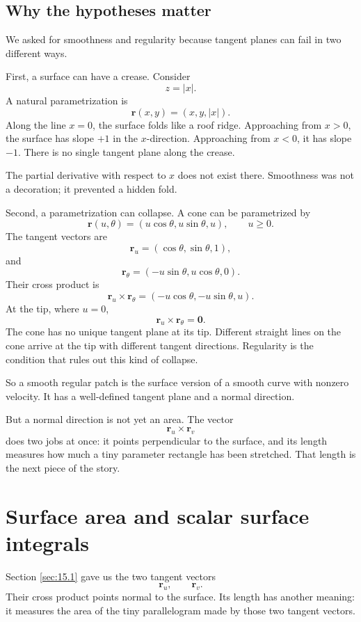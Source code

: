 \subsection{Why the hypotheses matter}

We asked for smoothness and regularity because tangent planes can fail in two different
ways.

First, a surface can have a crease.  Consider
\[
    z=|x|.
\]
A natural parametrization is
\[
    \mathbf r(x,y)=(x,y,|x|).
\]
Along the line \(x=0\), the surface folds like a roof ridge.  Approaching from \(x>0\),
the surface has slope \(+1\) in the \(x\)-direction.  Approaching from \(x<0\), it has
slope \(-1\).  There is no single tangent plane along the crease.

The partial derivative with respect to \(x\) does not exist there.  Smoothness was not
a decoration; it prevented a hidden fold.

Second, a parametrization can collapse.  A cone can be parametrized by
\[
    \mathbf r(u,\theta)=(u\cos\theta,u\sin\theta,u),
    \qquad
    u\ge0.
\]
The tangent vectors are
\[
    \mathbf r_u=(\cos\theta,\sin\theta,1),
\]
and
\[
    \mathbf r_\theta=(-u\sin\theta,u\cos\theta,0).
\]
Their cross product is
\[
    \mathbf r_u\times\mathbf r_\theta
    =
    (-u\cos\theta,-u\sin\theta,u).
\]
At the tip, where \(u=0\),
\[
    \mathbf r_u\times\mathbf r_\theta=\mathbf 0.
\]
The cone has no unique tangent plane at its tip.  Different straight lines on the cone
arrive at the tip with different tangent directions.  Regularity is the condition that
rules out this kind of collapse.

So a smooth regular patch is the surface version of a smooth curve with nonzero
velocity.  It has a well-defined tangent plane and a normal direction.

But a normal direction is not yet an area.  The vector
\[
    \mathbf r_u\times\mathbf r_v
\]
does two jobs at once: it points perpendicular to the surface, and its length measures
how much a tiny parameter rectangle has been stretched.  That length is the next
piece of the story.

\section{Surface area and scalar surface integrals}
\label{sec:15.2}

Section \ref{sec:15.1} gave us the two tangent vectors
\[
    \mathbf r_u,\qquad \mathbf r_v.
\]
Their cross product points normal to the surface.  Its length has another meaning:
it measures the area of the tiny parallelogram made by those two tangent vectors.

